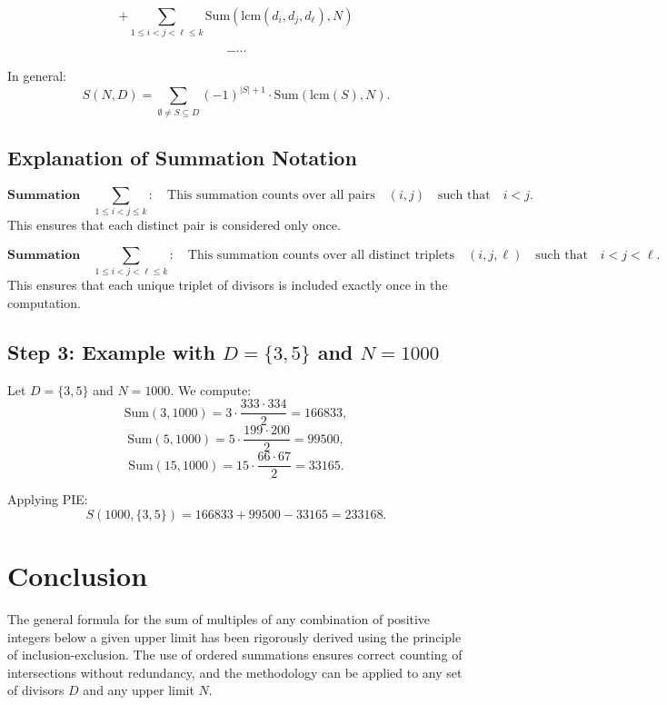 \documentclass{article}
\begin{document}
\[
+ \sum_{1 \leq i < j < \ell \leq k} \text{Sum}(\text{lcm}(d_i, d_j, d_\ell), N) 
\]

\[
- \cdots
\]

In general:
\[
S(N, D) = \sum_{\emptyset \neq S \subseteq D} (-1)^{|S| + 1} \cdot \text{Sum}(\text{lcm}(S), N).
\]

\subsection*{Explanation of Summation Notation}
\[
\textbf{Summation} \quad \sum_{1 \leq i < j \leq k}: \quad \text{This summation counts over all pairs} \quad (i, j) \quad \text{such that} \quad i < j. 
\]
This ensures that each distinct pair is considered only once.

\[
\textbf{Summation} \quad \sum_{1 \leq i < j < \ell \leq k}: \quad \text{This summation counts over all distinct triplets} \quad (i, j, \ell) \quad \text{such that} \quad i < j < \ell.
\]
This ensures that each unique triplet of divisors is included exactly once in the computation.

\subsection*{Step 3: Example with \( D = \{3, 5\} \) and \( N = 1000 \)}
Let \( D = \{3, 5\} \) and \( N = 1000 \). We compute:
\[
\text{Sum}(3, 1000) = 3 \cdot \frac{333 \cdot 334}{2} = 166833,
\]
\[
\text{Sum}(5, 1000) = 5 \cdot \frac{199 \cdot 200}{2} = 99500,
\]
\[
\text{Sum}(15, 1000) = 15 \cdot \frac{66 \cdot 67}{2} = 33165.
\]

Applying PIE:
\[
S(1000, \{3, 5\}) = 166833 + 99500 - 33165 = 233168.
\]

\section*{Conclusion}
The general formula for the sum of multiples of any combination of positive integers below a given upper limit has been rigorously derived using the principle of inclusion-exclusion. The use of ordered summations ensures correct counting of intersections without redundancy, and the methodology can be applied to any set of divisors \( D \) and any upper limit \( N \).
\end{document}
